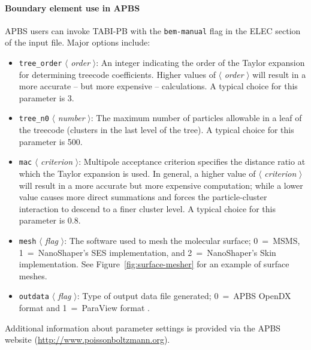 \documentclass[11pt,titlepage]{article}
\newcommand{\keyword}[1]{\texttt{#1}}
\newcommand{\param}[1]{$\langle$ \textit{#1} $\rangle$}
\begin{document}
\paragraph{Boundary element use in APBS}
APBS users can invoke TABI-PB with the \keyword{bem-manual} flag in the ELEC section of the input file. Major options include:
\begin{itemize}
	\item \keyword{tree\_order} \param{order}:  An integer indicating the order of the Taylor expansion for determining treecode coefficients.
	Higher values of \param{order} will result in a more accurate -- but more expensive --  calculations.
	A typical choice for this parameter is 3.
	\item \keyword{tree\_n0} \param{number}:  The maximum number of particles allowable in a leaf of the treecode (clusters in the last level of the tree).
	A typical choice for this parameter is 500.
	\item \keyword{mac} \param{criterion}:  Multipole acceptance criterion specifies the distance ratio at which the Taylor expansion is used.
	In general, a higher value of \param{criterion} will result in a more accurate but more expensive computation; while a lower value causes more direct summations and forces the particle-cluster interaction to descend to a finer cluster level. 
	A typical choice for this parameter is 0.8.
	\item \keyword{mesh} \param{flag}:  The software used to mesh the molecular surface; 0~=~MSMS, 1~=~NanoShaper's SES implementation, and 2~=~NanoShaper's Skin implementation.
	See Figure~\ref{fig:surface-mesher} for an example of surface meshes.
	\item \keyword{outdata} \param{flag}: Type of output data file generated; 0~=~APBS OpenDX format \cite{OpenDX} and 1~=~ParaView format \cite{ParaView}.
\end{itemize}
Additional information about parameter settings is provided via the APBS website (\url{http://www.poissonboltzmann.org}).
\end{document}
